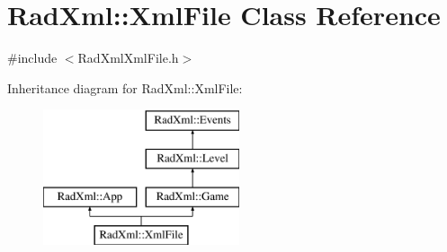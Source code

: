 \hypertarget{class_rad_xml_1_1_xml_file}{\section{Rad\-Xml\-:\-:Xml\-File Class Reference}
\label{class_rad_xml_1_1_xml_file}
}


{\ttfamily \#include $<$Rad\-Xml\-Xml\-File.\-h$>$}

Inheritance diagram for Rad\-Xml\-:\-:Xml\-File\-:\begin{figure}[H]
\begin{center}
\leavevmode
\includegraphics[height=4.000000cm]{class_rad_xml_1_1_xml_file}
\end{center}
\end{figure}
